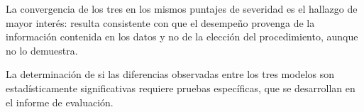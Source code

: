 \documentclass[11pt]{article}
\begin{document}
La convergencia de los tres en los mismos puntajes de severidad es el hallazgo de mayor interés:
resulta consistente con que el desempeño provenga de la información contenida en los datos y no de
la elección del procedimiento, aunque no lo demuestra.

La determinación de si las diferencias observadas entre los tres modelos son estadísticamente
significativas requiere pruebas específicas, que se desarrollan en el informe de evaluación.

\printbibliography[title={Referencias}]
\end{document}
